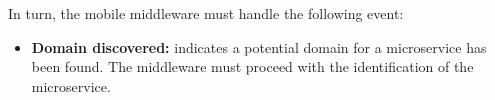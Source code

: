 In turn, the mobile middleware must handle the following event:

\begin{itemize}
	
	\item \textbf{Domain discovered:} indicates a potential domain for a microservice has been found. The middleware must proceed with the identification of the microservice.
	
	
\end{itemize}








